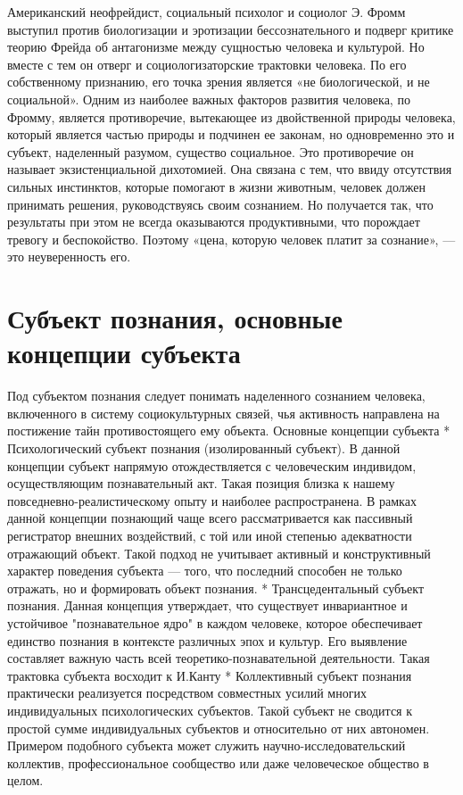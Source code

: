 \documentclass[12pt]{article}
\begin{document}
Американский неофрейдист, социальный психолог и социолог Э. Фромм выступил против биологизации и
эротизации бессознательного и подверг критике теорию Фрейда об антагонизме между сущностью человека и
культурой.  Но  вместе  с  тем  он  отверг  и  социологизаторские  трактовки  человека.  По  его  собственному
признанию,  его  точка  зрения  является  «не  биологической,  и  не  социальной».  Одним  из  наиболее  важных
факторов  развития  человека,  по  Фромму,  является  противоречие,  вытекающее  из  двойственной  природы
человека,  который  является  частью  природы  и  подчинен  ее  законам,  но  одновременно  это  и  субъект,
наделенный разумом, существо социальное. Это противоречие он называет экзистенциальной дихотомией. Она
связана  с  тем,  что  ввиду  отсутствия  сильных  инстинктов,  которые  помогают  в  жизни  животным,  человек
должен принимать решения, руководствуясь своим сознанием. Но получается так, что результаты при этом не
всегда оказываются продуктивными, что порождает тревогу и беспокойство. Поэтому «цена, которую человек
платит за сознание», — это неуверенность его.

\newpage
\section{Субъект познания, основные концепции субъекта}
Под  субъектом  познания  следует  понимать  наделенного  сознанием  человека,  включенного  в  систему
социокультурных связей, чья активность направлена на постижение тайн противостоящего ему объекта. 
Основные концепции субъекта
   * Психологический субъект познания (изолированный субъект). В данной концепции субъект напрямую
отождествляется с человеческим индивидом, осуществляющим познавательный акт. Такая позиция близка к
нашему  повседневно-реалистическому  опыту  и  наиболее  распространена.  В  рамках  данной  концепции
познающий чаще всего рассматривается как пассивный регистратор внешних воздействий, с той или иной
степенью адекватности отражающий объект. Такой подход не учитывает активный и конструктивный характер
поведения субъекта — того, что последний способен не только отражать, но и формировать объект познания.
   * Трансцедентальный субъект познания. Данная концепция утверждает, что существует инвариантное и
устойчивое "познавательное ядро" в каждом человеке, которое обеспечивает единство познания в контексте
различных  эпох  и  культур.  Его  выявление  составляет  важную  часть  всей  теоретико-познавательной
деятельности. Такая трактовка субъекта восходит к И.Канту
    *  Коллективный  субъект  познания  практически  реализуется  посредством  совместных  усилий  многих
индивидуальных психологических субъектов. Такой субъект не сводится к простой сумме индивидуальных
субъектов  и  относительно  от  них  автономен.  Примером  подобного  субъекта  может  служить  научно-исследовательский коллектив, профессиональное сообщество или даже человеческое общество в целом.
\end{document}
